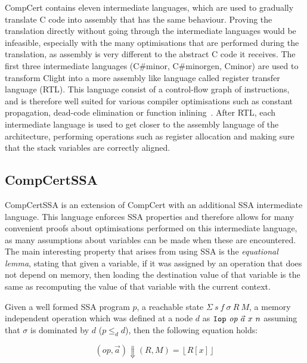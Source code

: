 CompCert contains eleven intermediate languages, which are used to gradually
translate C code into assembly that has the same behaviour.  Proving the
translation directly without going through the intermediate languages would be
infeasible, especially with the many optimisations that are performed during the
translation, as assembly is very different to the abstract C code it receives.
The first three intermediate languages (C\#minor, C\#minorgen, Cminor) are used
to transform Clight into a more assembly like language called register transfer
language (RTL).  This language consist of a control-flow graph of instructions,
and is therefore well suited for various compiler optimisations such as constant
propagation, dead-code elimination or function
inlining~\cite{tristan08_formal_verif_trans_valid}.  After RTL, each
intermediate language is used to get closer to the assembly language of the
architecture, performing operations such as register allocation and making sure
that the stack variables are correctly aligned.

\subsection{CompCertSSA}%
\label{sec:bg:compcertssa}

CompCertSSA is an extension of CompCert with an additional
\gls{SSA} intermediate language.  This language enforces \gls{SSA} properties
and therefore allows for many convenient proofs about optimisations performed on
this intermediate language, as many assumptions about variables can be made when
these are encountered.  The main interesting property that arises from using
\gls{SSA} is the \emph{equational lemma}, stating that given a variable, if it
was assigned by an operation that does not depend on memory, then loading the
destination value of that variable is the same as recomputing the value of that
variable with the current context.

Given a well formed SSA program $p$, a reachable state
$\Sigma\ s\ f\ \sigma\ R\ M$, a memory independent operation which was defined
at a node $d$ as $\mono{Iop}\ \mathit{op}\ \vec{a}\ x\ n$ assuming that $\sigma$
is dominated by $d$ ($p \le_{d} d$), then the following equation holds:

\begin{equation}\label{eq:equational-lemma}
  \left(\mathit{op}, \vec{a}\right) \Downarrow (R, M) = \left\lfloor R[x] \right\rfloor
\end{equation}

